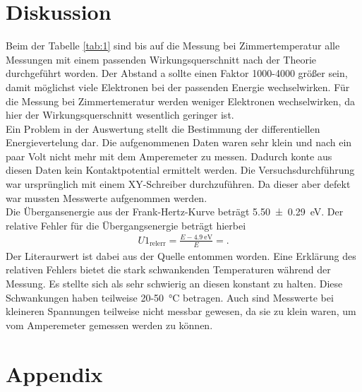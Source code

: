 \section{Diskussion}
Beim der Tabelle \ref{tab:1} sind bis auf die Messung bei Zimmertemperatur alle
Messungen mit einem passenden Wirkungsquerschnitt nach der Theorie durchgeführt worden.
Der Abstand a sollte einen Faktor 1000-4000 größer sein, damit möglichst viele Elektronen
bei der passenden Energie wechselwirken. Für die Messung bei Zimmertemeratur werden
weniger Elektronen wechselwirken, da hier der Wirkungsquerschnitt wesentlich geringer ist.\\
Ein Problem in der Auswertung stellt die Bestimmung der differentiellen Energievertelung dar.
Die aufgenommenen Daten waren sehr klein und nach ein paar Volt nicht mehr mit dem 
Amperemeter zu messen. Dadurch konte aus diesen Daten kein Kontaktpotential ermittelt werden.
Die Versuchsdurchführung war ursprünglich mit einem XY-Schreiber durchzuführen.
Da dieser aber defekt war mussten Messwerte aufgenommen werden. \\
Die Übergansenergie aus der Frank-Hertz-Kurve beträgt \SI{5.50+-0.29}{\electronvolt}.
Der relative Fehler für die Übergangsenergie beträgt hierbei
\begin{align}
    U1_{\text{relerr}} = \frac{E-\SI{4.9}{\electronvolt}}{E} =\text{}. \label{eq:10} 
\end{align}
Der Literaurwert ist dabei aus der Quelle \cite{linsen200926} entommen worden.
Eine Erklärung des relativen Fehlers bietet die stark schwankenden Temperaturen
während der Messung. Es stellte sich als sehr schwierig an diesen konstant zu halten.
Diese Schwankungen haben teilweise 20-\SI{50}{\celsius} betragen. Auch sind Messwerte bei kleineren
Spannungen teilweise nicht messbar gewesen, da sie zu klein waren, um vom Amperemeter 
gemessen werden zu können.



\newpage
\printbibliography
\newpage
\section*{Appendix}



